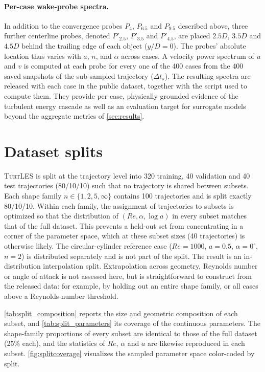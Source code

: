 \documentclass{article}
\begin{document}
{\color{revcolor}
\paragraph{Per-case wake-probe spectra.}
In addition to the convergence probes $P_{4}$, $P_{6.5}$ and $P_{9.5}$ described above, three further centerline probes, denoted $P'_{2.5}$, $P'_{3.5}$ and $P'_{4.5}$, are placed $2.5D$, $3.5D$ and $4.5D$ behind the trailing edge of each object ($y/D=0$). The probes' absolute location thus varies with $a$, $n$, and $\alpha$ across cases. A velocity power spectrum of $u$ and $v$ is computed at each probe for every one of the 400 cases from the 400 saved snapshots of the sub-sampled trajectory ($\Delta t_s$). The resulting spectra are released with each case in the public dataset, together with the script used to compute them. They provide per-case, physically grounded evidence of the turbulent energy cascade as well as an evaluation target for surrogate models beyond the aggregate metrics of \autoref{sec:results}.
}

{\color{revcolor} \section{Dataset splits} \label{sec:appsplit}
\textsc{TurtLES} is split at the trajectory level into 320 training, 40 validation and 40 test trajectories (80/10/10) such that no trajectory is shared between subsets. Each shape family $n \in \{1, 2, 5, \infty\}$ contains 100 trajectories and is split exactly 80/10/10. Within each family, the assignment of trajectories to subsets is optimized so that the distribution of $(Re, \alpha, \log a)$ in every subset matches that of the full dataset. This prevents a held-out set from concentrating in a corner of the parameter space, which at these subset sizes (40 trajectories) is otherwise likely. The circular-cylinder reference case ($Re = 1000$, $a = 0.5$, $\alpha = 0^\circ$, $n = 2$) is distributed separately and is not part of the split. The result is an in-distribution interpolation split. Extrapolation across geometry, Reynolds number or angle of attack is not assessed here, but is straightforward to construct from the released data: for example, by holding out an entire shape family, or all cases above a Reynolds-number threshold.


\autoref{tab:split_composition} reports the size and geometric composition of each subset, and \autoref{tab:split_parameters} its coverage of the continuous parameters. The shape-family proportions of every subset are identical to those of the full dataset (25\% each), and the statistics of $Re$, $\alpha$ and $a$ are likewise reproduced in each subset. \autoref{fig:splitcoverage} visualizes the sampled parameter space color-coded by split.
}
\end{document}
